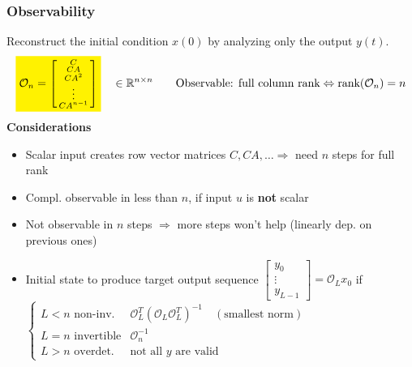 \subsubsection{Observability}
Reconstruct the initial condition $x(0)$ by analyzing only the output $y(t)$.
\begin{equation*}
    \stabilo{\mathcal{O}_n =
    \begin{bsmallmatrix}
    C \\ CA \\ CA^2 \\ \vdots \\ CA^{n-1}
    \end{bsmallmatrix}} \quad \in \mathbb{R}^{n \times n}
    \qquad \text{Observable: full column rank} \Leftrightarrow \text{rank}(\mathcal{O}_n) = n 
\end{equation*}
\textbf{Considerations}
\begin{itemize}
    \item Scalar input creates row vector matrices $C, CA,\ldots \Rightarrow$ need $n$ steps for full rank
    \item Compl. observable in less than $n$, if input $u$ is \textbf{not} scalar
    \item Not observable in $n$ steps $\Rightarrow$ more steps won't help (linearly dep. on previous ones)
    \item Initial state to produce target output sequence $\begin{bmatrix}
    y_0 \\
    \vdots \\
    y_{L-1}
    \end{bmatrix} = \mathcal{O}_L x_0$ if $\begin{cases} 
        L<n \text{ non-inv.} &\mathcal{O}_L^T(\mathcal{O}_L\mathcal{O}_L^T)^{-1} \quad (\text{smallest norm}) \\ 
        L=n \text{ invertible} &\mathcal{O}_n^{-1} \\ 
        L>n \text{ overdet.} & \text{not all } y \text{ are valid}
        
        \end{cases}$ 
\end{itemize}

